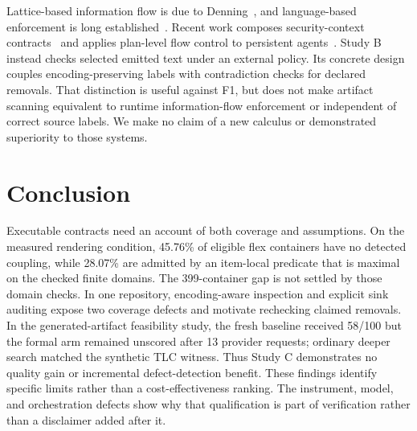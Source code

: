\documentclass[acmsmall,screen,review,anonymous,nonacm]{acmart}
\begin{document}
Lattice-based information flow is due to Denning~\cite{denning1976}, and language-based enforcement is long established~\cite{sabelfeld2003}. Recent work composes security-context contracts~\cite{continuity2026} and applies plan-level flow control to persistent agents~\cite{spa2026}. Study B instead checks selected emitted text under an external policy. Its concrete design couples encoding-preserving labels with contradiction checks for declared removals. That distinction is useful against F1, but does not make artifact scanning equivalent to runtime information-flow enforcement or independent of correct source labels. We make no claim of a new calculus or demonstrated superiority to those systems.

\section{Conclusion}
Executable contracts need an account of both coverage and assumptions. On the measured rendering condition, 45.76\% of eligible flex containers have no detected coupling, while 28.07\% are admitted by an item-local predicate that is maximal on the checked finite domains. The 399-container gap is not settled by those domain checks. In one repository, encoding-aware inspection and explicit sink auditing expose two coverage defects and motivate rechecking claimed removals. In the generated-artifact feasibility study, the fresh baseline received 58/100 but the formal arm remained unscored after 13 provider requests; ordinary deeper search matched the synthetic TLC witness. Thus Study C demonstrates no quality gain or incremental defect-detection benefit. These findings identify specific limits rather than a cost-effectiveness ranking. The instrument, model, and orchestration defects show why that qualification is part of verification rather than a disclaimer added after it.
\end{document}
